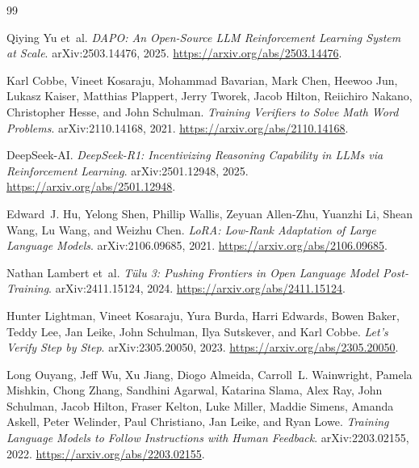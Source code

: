 \documentclass[11pt]{article}
\begin{document}
\newpage
\begin{thebibliography}{99}

    Qiying Yu et~al.
    \newblock \emph{DAPO: An Open-Source LLM Reinforcement Learning System at Scale}.
    \newblock arXiv:2503.14476, 2025.
    \newblock \url{https://arxiv.org/abs/2503.14476}.

Karl Cobbe, Vineet Kosaraju, Mohammad Bavarian, Mark Chen, Heewoo Jun, Lukasz Kaiser, Matthias Plappert, Jerry Tworek, Jacob Hilton, Reiichiro Nakano, Christopher Hesse, and John Schulman.
\newblock \emph{Training Verifiers to Solve Math Word Problems}.
\newblock arXiv:2110.14168, 2021.
\newblock \url{https://arxiv.org/abs/2110.14168}.

DeepSeek-AI.
\newblock \emph{DeepSeek-R1: Incentivizing Reasoning Capability in LLMs via Reinforcement Learning}.
\newblock arXiv:2501.12948, 2025.
\newblock \url{https://arxiv.org/abs/2501.12948}.

Edward~J. Hu, Yelong Shen, Phillip Wallis, Zeyuan Allen-Zhu, Yuanzhi Li, Shean Wang, Lu Wang, and Weizhu Chen.
\newblock \emph{LoRA: Low-Rank Adaptation of Large Language Models}.
\newblock arXiv:2106.09685, 2021.
\newblock \url{https://arxiv.org/abs/2106.09685}.

Nathan Lambert et~al.
\newblock \emph{T\"ulu 3: Pushing Frontiers in Open Language Model Post-Training}.
\newblock arXiv:2411.15124, 2024.
\newblock \url{https://arxiv.org/abs/2411.15124}.

Hunter Lightman, Vineet Kosaraju, Yura Burda, Harri Edwards, Bowen Baker, Teddy Lee, Jan Leike, John Schulman, Ilya Sutskever, and Karl Cobbe.
\newblock \emph{Let's Verify Step by Step}.
\newblock arXiv:2305.20050, 2023.
\newblock \url{https://arxiv.org/abs/2305.20050}.

Long Ouyang, Jeff Wu, Xu Jiang, Diogo Almeida, Carroll~L. Wainwright, Pamela Mishkin, Chong Zhang, Sandhini Agarwal, Katarina Slama, Alex Ray, John Schulman, Jacob Hilton, Fraser Kelton, Luke Miller, Maddie Simens, Amanda Askell, Peter Welinder, Paul Christiano, Jan Leike, and Ryan Lowe.
\newblock \emph{Training Language Models to Follow Instructions with Human Feedback}.
\newblock arXiv:2203.02155, 2022.
\newblock \url{https://arxiv.org/abs/2203.02155}.


\end{thebibliography}
\end{document}
